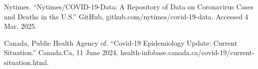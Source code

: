 \documentclass[fontsize=11pt]{article}
\begin{document}
Nytimes. “Nytimes/COVID-19-Data: A Repository of Data on Coronavirus Cases and Deaths in the U.S.” GitHub, github.com/nytimes/covid-19-data. Accessed 4 Mar. 2025. 

Canada, Public Health Agency of. “Covid-19 Epidemiology Update: Current Situation.” Canada.Ca, 11 June 2024, health-infobase.canada.ca/covid-19/current-situation.html. 

\end{document}
